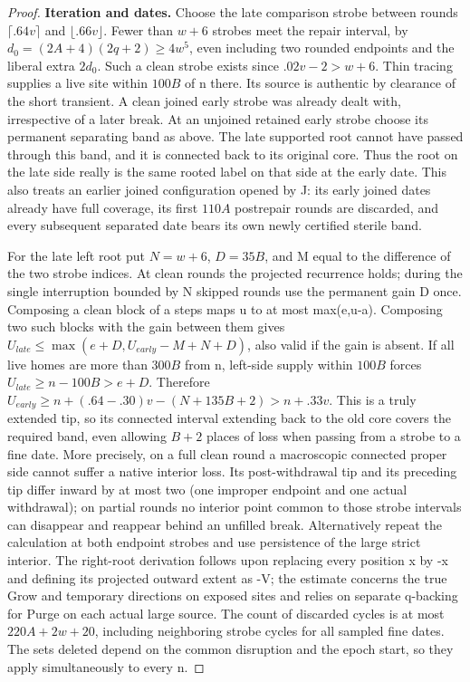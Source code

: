 \begin{proof}
\textbf{Iteration and dates.} Choose the late comparison strobe between rounds \(\lceil .64v \rceil \) and \(\lfloor .66v \rfloor \). Fewer than \(w+6\) strobes meet the repair interval, by \(d_0=(2A+4)(2q+2)\ge 4w^5\), even including two rounded endpoints and the liberal extra \(2d_0\). Such a clean strobe exists since \(.02v-2>w+6\). Thin tracing supplies a live site within \(100B\) of n there. Its source is authentic by clearance of the short transient. A clean joined early strobe was already dealt with, irrespective of a later break. At an unjoined retained early strobe choose its permanent separating band as above. The late supported root cannot have passed through this band, and it is connected back to its original core. Thus the root on the late side really is the same rooted label on that side at the early date. This also treats an earlier joined configuration opened by J: its early joined dates already have full coverage, its first \(110A\) postrepair rounds are discarded, and every subsequent separated date bears its own newly certified sterile band.

For the late left root put \(N=w+6\), \(D=35B\), and M equal to the difference of the two strobe indices. At clean rounds the projected recurrence holds; during the single interruption bounded by N skipped rounds use the permanent gain D once. Composing a clean block of a steps maps u to at most max(e,u-a). Composing two such blocks with the gain between them gives \(U_{late}\le \max (e+D,U_{early}-M+N+D)\), also valid if the gain is absent. If all live homes are more than \(300B\) from n, left-side supply within \(100B\) forces \(U_{late}\ge n-100B>e+D\). Therefore \(U_{early}\ge n+(.64-.30)v-(N+135B+2)>n+.33v\). This is a truly extended tip, so its connected interval extending back to the old core covers the required band, even allowing \(B+2\) places of loss when passing from a strobe to a fine date. More precisely, on a full clean round a macroscopic connected proper side cannot suffer a native interior loss. Its post-withdrawal tip and its preceding tip differ inward by at most two (one improper endpoint and one actual withdrawal); on partial rounds no interior point common to those strobe intervals can disappear and reappear behind an unfilled break. Alternatively repeat the calculation at both endpoint strobes and use persistence of the large strict interior. The right-root derivation follows upon replacing every position x by -x and defining its projected outward extent as -V; the estimate concerns the true Grow and temporary directions on exposed sites and relies on separate q-backing for Purge on each actual large source. The count of discarded cycles is at most \(220A+2w+20\), including neighboring strobe cycles for all sampled fine dates. The sets deleted depend on the common disruption and the epoch start, so they apply simultaneously to every n.


\end{proof}
